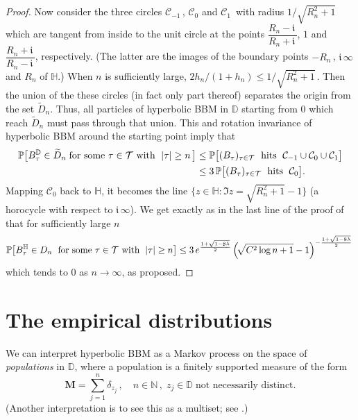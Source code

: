 \documentclass[12pt]{amsart}
\newcommand\BB{\textit{\textbf{B}}}
\newcommand\DD{\mathbb D}
\newcommand\HH{\mathbb H}
\newcommand\im{\mathfrak{i}\,}
\newcommand\Mbf{\mathbf M}
\newcommand\N{\mathbb N}
\newcommand\Prob{\mathbb P}
\newcommand\T{\mathcal T}
\newcommand\wt{\widetilde}
\numberwithin{theorem}{section}
\theoremstyle{definition}
\begin{document}
\begin{proof}
Now consider the three circles $\mathcal{C}_{-1}\,$, $\mathcal{C}_0 $ and $\mathcal{C}_1\,$
with radius $1\big/\!\sqrt{R_n^2+1}$ which are tangent from inside to the unit circle at the points
$\dfrac{R_n-\im}{R_n+\im}$, $1$ and $\dfrac{R_n+\im}{R_n-\im}$, respectively. (The latter are 
the images of the boundary points $-R_n\,$, $\im\infty$ and $R_n$ of $\HH$.)
When $n$ is sufficiently large, $2h_n/(1+h_n) \le 1\big/\!\sqrt{R_n^2+1}\,$.
Then the union of the these circles (in fact only part thereof) separates the origin from the set 
$\wt D_n$. Thus, all particles of hyperbolic BBM in $\DD$ starting from $0$ which reach $\wt D_n$
must pass through that union. This and rotation invariance of hyperbolic BBM around the starting
point imply that 
$$
\begin{aligned}
\Prob\bigl[ \BB_{\tau}^{\DD} \in \wt D_n \;\text{for some $\tau \in \T$ with }\; |\tau| \ge n\, \bigr] &\le 
\Prob\bigl[ (\BB_{\tau})_{\tau \in \T}  \; \text{ hits }\; 
\mathcal{C}_{-1} \cup \mathcal{C}_{0} \cup \mathcal{C}_1 \bigr] \\
&\le 3 \, \Prob\bigl[ (\BB_{\tau})_{\tau \in \T}  \; \text{ hits }\; \mathcal{C}_{0}\bigr]. 
\end{aligned}
$$
Mapping $\mathcal{C}_0$ back to $\HH$, it becomes the line  
$\{ z \in \HH : \Im z = \sqrt{R_n^2+1} - 1 \}$ (a horocycle with respect to $\im\infty$). 
We get exactly as in the last line of the proof of \cite[Prop. 4]{LS} that
for sufficiently large $n$ 
$$
\Prob\bigl[ \BB_{\tau}^{\HH} \in D_n \; %
\text{ for some $\tau \in \T$ with }\; |\tau| \ge n \bigr]%
\le 3\, e^{\frac{1+\sqrt{1-8\lambda}}{2}} 
\left(\!\sqrt{C^2 \log n + 1}  - 1 \right)^{-\frac{1+\sqrt{1-8\lambda}}{2}}\,
$$
which tends to $0$ as $n \to \infty$, as proposed.
\end{proof}

\section{The empirical distributions}\label{sec:empdis}

We can interpret hyperbolic BBM as a Markov process on the space of \emph{populations}
in $\DD$, where a population is a finitely supported measure of the form
$$
\Mbf = \sum_{j=1}^n \delta_{z_j}\,,\quad n \in \N\,, \; z_j \in \DD\; \text{not necessarily distinct.}
$$
(Another interpretation is to see this as a multiset; see \cite{KW}.) 
\end{document}
